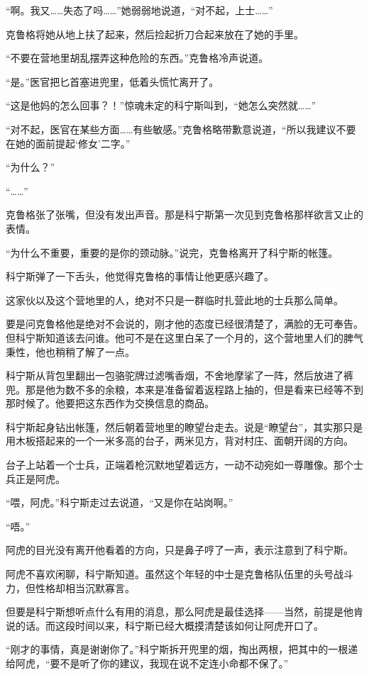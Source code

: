 “啊。我又……失态了吗……”她弱弱地说道，“对不起，上士……”

克鲁格将她从地上扶了起来，然后捡起折刀合起来放在了她的手里。

“不要在营地里胡乱摆弄这种危险的东西。”克鲁格冷声说道。

“是。”医官把匕首塞进兜里，低着头慌忙离开了。

“这是他妈的怎么回事？！”惊魂未定的科宁斯叫到，“她怎么突然就……”

“对不起，医官在某些方面……有些敏感。”克鲁格略带歉意说道，“所以我建议不要在她的面前提起‘修女’二字。”

“为什么？”

“……”

克鲁格张了张嘴，但没有发出声音。那是科宁斯第一次见到克鲁格那样欲言又止的表情。

“为什么不重要，重要的是你的颈动脉。”说完，克鲁格离开了科宁斯的帐篷。

科宁斯弹了一下舌头，他觉得克鲁格的事情让他更感兴趣了。

这家伙以及这个营地里的人，绝对不只是一群临时扎营此地的士兵那么简单。

要是问克鲁格他是绝对不会说的，刚才他的态度已经很清楚了，满脸的无可奉告。但科宁斯知道该去问谁。他可不是在这里白呆了一个月的，这个营地里人们的脾气秉性，他也稍稍了解了一点。

科宁斯从背包里翻出一包骆驼牌过滤嘴香烟，不舍地摩挲了一阵，然后放进了裤兜。那是他为数不多的余粮，本来是准备留着返程路上抽的，但是看来已经等不到那时候了。他要把这东西作为交换信息的商品。

科宁斯起身钻出帐篷，然后朝着营地里的瞭望台走去。说是“瞭望台”，其实那只是用木板搭起来的一个一米多高的台子，两米见方，背对村庄、面朝开阔的方向。

台子上站着一个士兵，正端着枪沉默地望着远方，一动不动宛如一尊雕像。那个士兵正是阿虎。

“喂，阿虎。”科宁斯走过去说道，“又是你在站岗啊。”

“唔。”

阿虎的目光没有离开他看着的方向，只是鼻子哼了一声，表示注意到了科宁斯。

阿虎不喜欢闲聊，科宁斯知道。虽然这个年轻的中士是克鲁格队伍里的头号战斗力，但性格却相当沉默寡言。

但要是科宁斯想听点什么有用的消息，那么阿虎是最佳选择——当然，前提是他肯说的话。而这段时间以来，科宁斯已经大概摸清楚该如何让阿虎开口了。

“刚才的事情，真是谢谢你了。”科宁斯拆开兜里的烟，掏出两根，把其中的一根递给阿虎，“要不是听了你的建议，我现在说不定连小命都不保了。”

